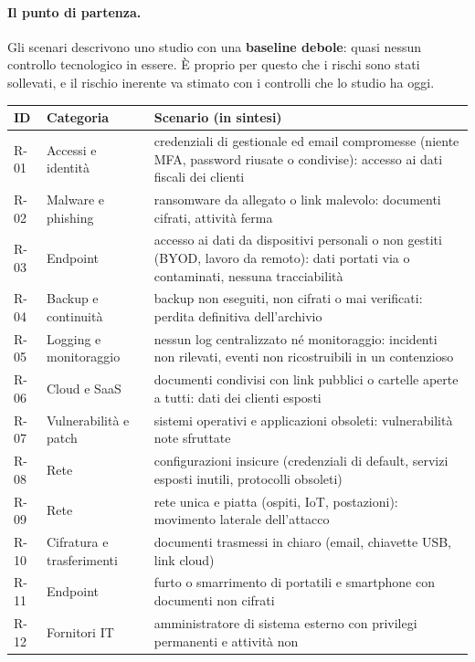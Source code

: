 \paragraph{Il punto di partenza.} Gli scenari descrivono uno studio con una \textbf{baseline debole}:
quasi nessun controllo tecnologico in essere. È proprio per questo che i rischi sono stati sollevati, e
il rischio inerente va stimato con i controlli che lo studio ha oggi.

\begin{center}
\small
\begin{tabularx}{\linewidth}{l >{\raggedright\arraybackslash}p{3.2cm} X}
\toprule
\textbf{ID} & \textbf{Categoria} & \textbf{Scenario (in sintesi)} \\ \midrule
R-01 & Accessi e identità & credenziali di gestionale ed email compromesse (niente MFA, password
  riusate o condivise): accesso ai dati fiscali dei clienti \\
R-02 & Malware e phishing & ransomware da allegato o link malevolo: documenti cifrati, attività ferma \\
R-03 & Endpoint & accesso ai dati da dispositivi personali o non gestiti (BYOD, lavoro da remoto): dati
  portati via o contaminati, nessuna tracciabilità \\
R-04 & Backup e continuità & backup non eseguiti, non cifrati o mai verificati: perdita definitiva
  dell'archivio \\
R-05 & Logging e monitoraggio & nessun log centralizzato né monitoraggio: incidenti non rilevati, eventi
  non ricostruibili in un contenzioso \\
R-06 & Cloud e SaaS & documenti condivisi con link pubblici o cartelle aperte a tutti: dati dei clienti
  esposti \\
R-07 & Vulnerabilità e patch & sistemi operativi e applicazioni obsoleti: vulnerabilità note sfruttate \\
R-08 & Rete & configurazioni insicure (credenziali di default, servizi esposti inutili, protocolli
  obsoleti) \\
R-09 & Rete & rete unica e piatta (ospiti, IoT, postazioni): movimento laterale dell'attacco \\
R-10 & Cifratura e trasferimenti & documenti trasmessi in chiaro (email, chiavette USB, link cloud) \\
R-11 & Endpoint & furto o smarrimento di portatili e smartphone con documenti non cifrati \\
R-12 & Fornitori IT & amministratore di sistema esterno con privilegi permanenti e attività non

\end{tabularx}
\end{center}
